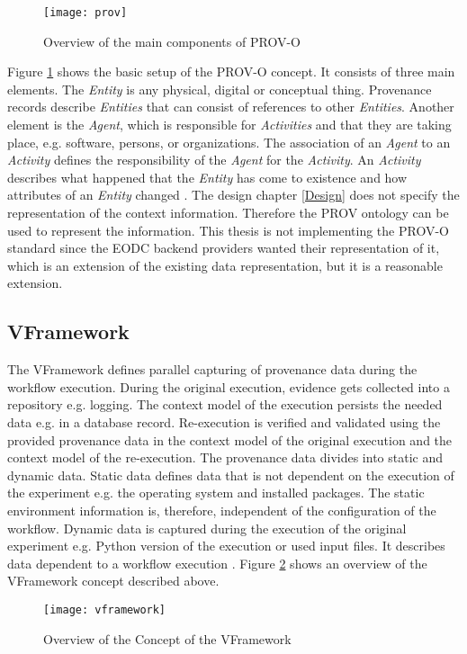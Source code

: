 \documentclass[draft,final]{vutinfth} %
\begin{document}
\begin{figure}[h]
	\centering
	\texttt{[image: prov]}
	\caption{Overview of the main components of PROV-O \cite{733f89c65e4844f9aabcae1c276a5602}}
	\label{fig:prov} %
\end{figure}

Figure \ref{fig:prov} shows the basic setup of the PROV-O concept. It consists of three main elements. The \textit{Entity} is any physical, digital or conceptual thing. Provenance records describe \textit{Entities} that can consist of references to other \textit{Entities}. Another element is the \textit{Agent}, which is responsible for \textit{Activities} and that they are taking place, e.g. software, persons, or organizations. The association of an \textit{Agent} to an \textit{Activity} defines the responsibility of the \textit{Agent} for the \textit{Activity}. An \textit{Activity} describes what happened that the \textit{Entity} has come to existence and how attributes of an \textit{Entity} changed \cite{733f89c65e4844f9aabcae1c276a5602}. The design chapter \ref{Design} does not specify the representation of the context information. Therefore the PROV ontology can be used to represent the information. This thesis is not implementing the PROV-O standard since the EODC backend providers wanted their representation of it, which is an extension of the existing data representation, but it is a reasonable extension. 
\subsection{VFramework}\label{vframework}

The VFramework defines parallel capturing of provenance data during the workflow execution. During the original execution, evidence gets collected into a repository e.g. logging. The context model of the execution persists the needed data e.g. in a database record. Re-execution is verified and validated using the provided provenance data in the context model of the original execution and the context model of the re-execution. The provenance data divides into static and dynamic data. Static data defines data that is not dependent on the execution of the experiment e.g. the operating system and installed packages. The static environment information is, therefore, independent of the configuration of the workflow. Dynamic data is captured during the execution of the original experiment e.g. Python version of the execution or used input files. It describes data dependent to a workflow execution \cite{Miksa2013FrameworkFV}. 
Figure \ref{fig:vframework} shows an overview of the VFramework concept described above.   
\begin{figure}[h]
	\centering
	\texttt{[image: vframework]}
	\caption{Overview of the Concept of the VFramework \cite{Miksa2013FrameworkFV}}
	\label{fig:vframework} %
\end{figure}
\end{document}
